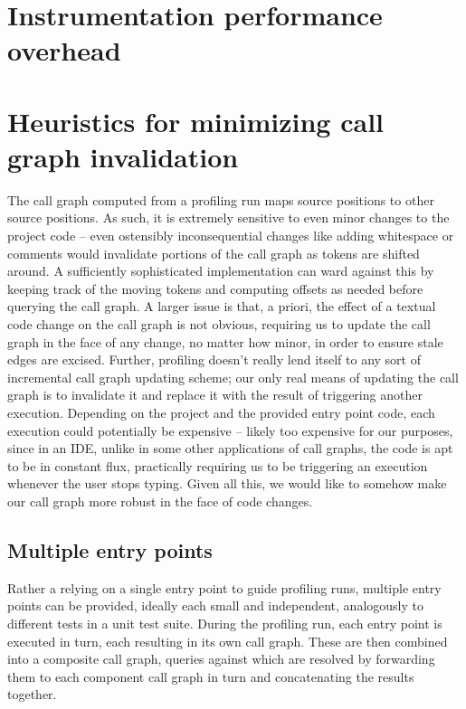 
\section{Instrumentation performance overhead}

\section{Heuristics for minimizing call graph invalidation}

The call graph computed from a profiling run maps source positions to other
source positions. As such, it is extremely sensitive to even minor changes to
the project code -- even ostensibly inconsequential changes like adding
whitespace or comments would invalidate portions of the call graph as tokens
are shifted around. A sufficiently sophisticated implementation can ward
against this by keeping track of the moving tokens and computing offsets as
needed before querying the call graph. A larger issue is that, a priori, the
effect of a textual code change on the call graph is not obvious, requiring us
to update the call graph in the face of any change, no matter how minor, in
order to ensure stale edges are excised. Further, profiling doesn't really lend
itself to any sort of incremental call graph updating scheme; our only real
means of updating the call graph is to invalidate it and replace it with the
result of triggering another execution. Depending on the project and the
provided entry point code, each execution could potentially be expensive --
likely too expensive for our purposes, since in an IDE, unlike in some other
applications of call graphs, the code is apt to be in constant flux,
practically requiring us to be triggering an execution whenever the user stops
typing. Given all this, we would like to somehow make our call graph more
robust in the face of code changes.

\subsection{Multiple entry points}

Rather a relying on a single entry point to guide profiling runs, multiple
entry points can be provided, ideally each small and independent, analogously
to different tests in a unit test suite. During the profiling run, each entry
point is executed in turn, each resulting in its own call graph. These are then
combined into a composite call graph, queries against which are resolved by
forwarding them to each component call graph in turn and concatenating the
results together.

